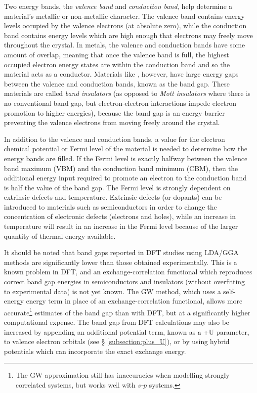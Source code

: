Two energy bands, the \emph{valence band} and \emph{conduction band}, help determine a material's metallic or non-metallic character. The valence band contains energy levels occupied by the valence electrons (at absolute zero), while the conduction band contains energy levels which are high enough that electrons may freely move throughout the crystal. In metals, the valence and conduction bands have some amount of overlap, meaning that once the valence band is full, the highest occupied electron energy states are within the conduction band and so the material acts as a conductor. Materials like \zirconia , however, have large energy gaps between the valence and conduction bands, known as the band gap. These materials are called \emph{band insulators} (as opposed to \emph{Mott insulators} where there is no conventional band gap, but electron-electron interactions impede electron promotion to higher energies), because the band gap is an energy barrier preventing the valence electrons from moving freely around the crystal. 

In addition to the valence and conduction bands, a value for the electron chemical potential or Fermi level of the material is needed to determine how the energy bands are filled. If the Fermi level is exactly halfway between the valence band maximum (VBM) and the conduction band minimum (CBM), then the additional energy input required to promote an electron to the conduction band is half the value of the band gap. The Fermi level is strongly dependent on extrinsic defects and temperature. Extrinsic defects (or dopants) can be introduced to materials such as semiconductors in order to change the concentration of electronic defects (electrons and holes), while an increase in temperature will result in an increase in the Fermi level because of the larger quantity of thermal energy available.

It should be noted that band gaps reported in DFT studies using LDA/GGA methods are significantly lower than those obtained experimentally. This is a known problem in DFT, and an exchange-correlation functional which reproduces correct band gap energies in semiconductors and insulators (without overfitting to experimental data) is not yet known. The GW method, which uses a self-energy energy term in place of an exchange-correlation functional, allows more accurate\footnote{The GW approximation still has inaccuracies when modelling strongly correlated systems, but works well with $s$-$p$ systems.} estimates of the band gap than with DFT, but at a significantly higher computational expense. The band gap from DFT calculations may also be increased by appending an additional potential term, known as a +U parameter, to valence electron orbitals (see § \ref{subsection:plus_U}), or by using hybrid potentials which can incorporate the exact exchange energy.

